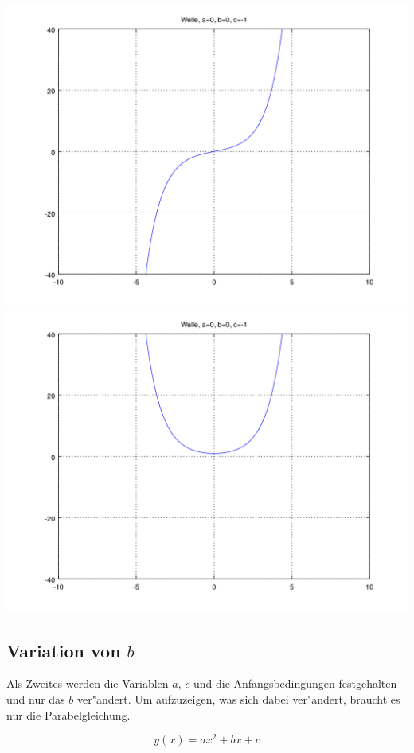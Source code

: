 \noindent
\includegraphics[scale=0.35]{./wellen/images/basicfunctions/sinh.png}
\includegraphics[scale=0.35]{./wellen/images/basicfunctions/cosh.png}

\subsection{Variation von $b$}

Als Zweites werden die Variablen $a$, $c$ und die Anfangsbedingungen 
festgehalten und nur das $b$ ver"andert. Um aufzuzeigen, was sich dabei 
ver"andert, braucht es nur die Parabelgleichung.

\begin{equation*}
	y(x) = ax^2 + bx + c
\end{equation*}


